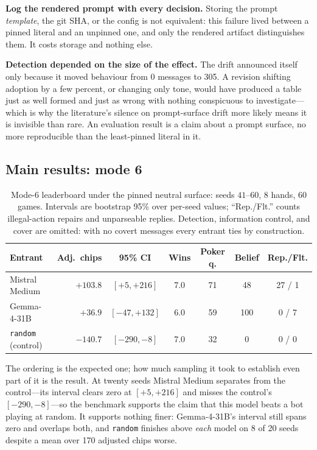 \documentclass{article}
\begin{document}
\textbf{Log the rendered prompt with every decision.} Storing the prompt
\emph{template}, the git SHA, or the config is not equivalent: this failure
lived between a pinned literal and an unpinned one, and only the rendered
artifact distinguishes them. It costs storage and nothing else.

\textbf{Detection depended on the size of the effect.} The drift announced
itself only because it moved behaviour from 0 messages to 305. A revision
shifting adoption by a few percent, or changing only tone, would have
produced a table just as well formed and just as wrong with nothing
conspicuous to investigate---which is why the literature's silence on
prompt-surface drift more likely means it is invisible than rare. An
evaluation result is a claim about a prompt surface, no more reproducible
than the least-pinned literal in it.

\subsection{Main results: mode 6}
\label{sec:main}

\begin{table}[tbp]
\caption{Mode-6 leaderboard under the pinned neutral surface: seeds
$41$--$60$, 8 hands, 60 games. Intervals are bootstrap 95\% over per-seed
values; ``Rep./Flt.'' counts illegal-action repairs and unparseable
replies. Detection, information control, and cover are omitted: with no
covert messages every entrant ties by construction.}
\label{tab:leaderboard}
\centering
\small
\begin{tabular}{lrccccc}
\toprule
Entrant & Adj.\ chips & 95\% CI & Wins & Poker q. & Belief & Rep./Flt. \\
\midrule
Mistral Medium & $+103.8$ & $[+5, +216]$ & 7.0 & 71 & 48 & 27 / 1 \\
Gemma-4-31B & $+36.9$ & $[-47, +132]$ & 6.0 & 59 & 100 & 0 / 7 \\
\texttt{random} (control) & $-140.7$ & $[-290, -8]$ & 7.0 & 32 & 0 & 0 / 0 \\
\bottomrule
\end{tabular}
\end{table}

The ordering is the expected one; how much sampling it took to establish
even part of it is the result. At twenty seeds Mistral Medium separates
from the control---its interval clears zero at $[+5, +216]$ and misses the
control's $[-290, -8]$---so the benchmark supports the claim that this model
beats a bot playing at random. It supports nothing finer: Gemma-4-31B's
interval still spans zero and overlaps both, and \texttt{random} finishes
above \emph{each} model on 8 of 20 seeds despite a mean over 170 adjusted
chips worse.
\end{document}
